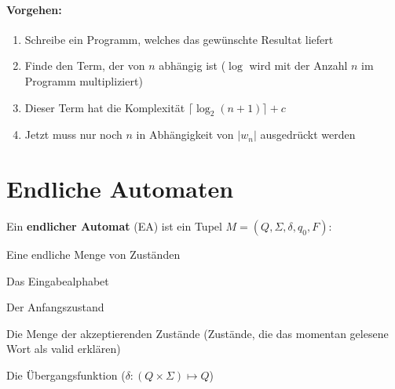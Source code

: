 \documentclass[11pt]{article}
\begin{document}
\paragraph{Vorgehen:}
\begin{enumerate}[noitemsep]
	\item Schreibe ein Programm, welches das gew{\"u}nschte Resultat liefert
	\item Finde den Term, der von $n$ abh{\"a}ngig ist ($\log$ wird mit der Anzahl $n$ im Programm multipliziert)
	\item Dieser Term hat die Komplexit{\"a}t $\lceil \log_2(n + 1) \rceil + c$
	\item Jetzt muss nur noch $n$ in Abhängigkeit von $|w_n|$ ausgedr{\"u}ckt werden
\end{enumerate}

\section{Endliche Automaten}

Ein \textbf{endlicher Automat} (EA) ist ein Tupel $M = (Q, \Sigma, \delta, q_0, F)$:
\begin{description}[labelindent=16pt,style=multiline,leftmargin=2.5cm, noitemsep]
	\item[$Q$:] Eine endliche Menge von Zust{\"a}nden
	\item[$\Sigma$:] Das Eingabealphabet
	\item[$q_0 \in Q$:] Der Anfangszustand
	\item[$F \subseteq Q$:] Die Menge der akzeptierenden Zust{\"a}nde (Zust{\"a}nde, die das momentan gelesene Wort als valid erkl{\"a}ren)
	\item[$\delta$:] Die {\"U}bergangsfunktion ($\delta: (Q\times\Sigma) \mapsto Q$)
\end{description}
\end{document}
